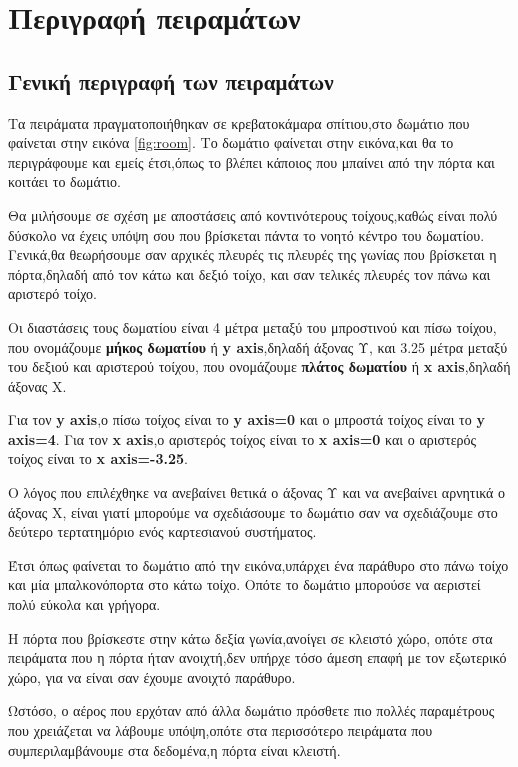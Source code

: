 \section{Περιγραφή πειραμάτων}
\label{sub:experiments}

\subsection{Γενική περιγραφή των πειραμάτων}

Τα πειράματα πραγματοποιήθηκαν σε κρεβατοκάμαρα σπίτιου,στο δωμάτιο που φαίνεται
στην εικόνα \autoref{fig:room}.
Το δωμάτιο φαίνεται στην εικόνα,και θα το περιγράφουμε και εμείς έτσι,όπως το βλέπει
κάποιος που μπαίνει από την πόρτα και κοιτάει το δωμάτιο.

Θα μιλήσουμε σε σχέση με αποστάσεις από κοντινότερους τοίχους,καθώς είναι πολύ
δύσκολο να έχεις υπόψη σου που βρίσκεται πάντα το νοητό
κέντρο του δωματίου.
Γενικά,θα θεωρήσουμε σαν αρχικές πλευρές τις πλευρές της γωνίας που βρίσκεται η
πόρτα,δηλαδή από τον κάτω και δεξιό τοίχο,
και σαν τελικές πλευρές τον πάνω και αριστερό τοίχο.

Οι διαστάσεις τους δωματίου είναι 4 μέτρα μεταξύ του μπροστινού και πίσω τοίχου,
που ονομάζουμε \textbf{μήκος δωματίου} ή \textbf{y axis},δηλαδή άξονας Υ,
και 3.25 μέτρα μεταξύ του δεξιού και αριστερού τοίχου,
που ονομάζουμε \textbf{πλάτος δωματίου} ή \textbf{x axis},δηλαδή άξονας X.

Για τον \textbf{y axis},ο πίσω τοίχος είναι το \textbf{y axis=0} και ο μπροστά τοίχος είναι το
\textbf{y axis=4}.
Για τον \textbf{x axis},ο αριστερός τοίχος είναι το \textbf{x axis=0} και ο αριστερός τοίχος
είναι το \textbf{x axis=-3.25}.

Ο λόγος που επιλέχθηκε να ανεβαίνει θετικά ο άξονας Υ και να ανεβαίνει αρνητικά ο
άξονας X,
είναι γιατί μπορούμε να σχεδιάσουμε το δωμάτιο σαν να σχεδιάζουμε στο δεύτερο
τερτατημόριο ενός καρτεσιανού συστήματος.

Έτσι όπως φαίνεται το δωμάτιο από την εικόνα,υπάρχει ένα παράθυρο στο πάνω τοίχο και
μία μπαλκονόπορτα στο κάτω τοίχο.
Οπότε το δωμάτιο μπορούσε να αεριστεί πολύ εύκολα και γρήγορα.

Η πόρτα που βρίσκεστε στην κάτω δεξία γωνία,ανοίγει σε κλειστό χώρο,
οπότε στα πειράματα που η πόρτα ήταν ανοιχτή,δεν υπήρχε τόσο άμεση επαφή με τον
εξωτερικό χώρο, για να είναι σαν έχουμε ανοιχτό παράθυρο.

Ωστόσο, ο αέρος που ερχόταν από άλλα δωμάτιο πρόσθετε πιο πολλές παραμέτρους που
χρειάζεται να λάβουμε υπόψη,οπότε στα περισσότερο
πειράματα που συμπεριλαμβάνουμε στα δεδομένα,η πόρτα είναι κλειστή.

